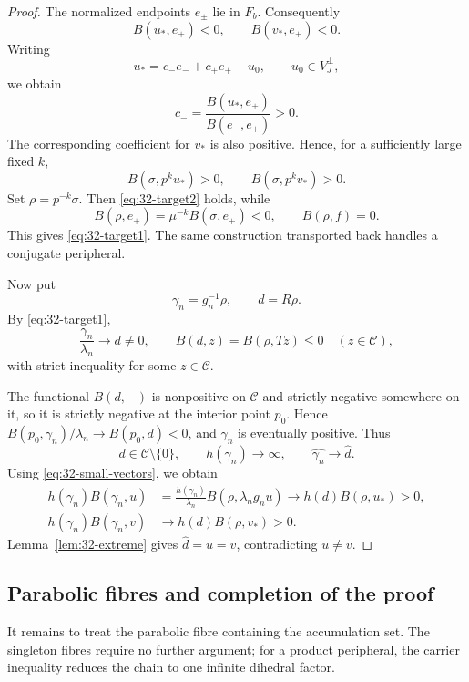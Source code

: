 \documentclass[11pt,reqno]{amsart}
\theoremstyle{plain}
\theoremstyle{definition}
\theoremstyle{remark}
\numberwithin{equation}{section}
\begin{document}
\begin{proof}
The normalized endpoints $e_\pm$ lie in $F_b$.
Consequently
\[
    B(u_*,e_+)<0,\qquad B(v_*,e_+)<0.
\]
Writing
\[
    u_*=c_-e_-+c_+e_++u_0,
    \qquad u_0\in V_J^\perp,
\]
we obtain
\[
    c_-=\frac{B(u_*,e_+)}{B(e_-,e_+)}>0.
\]
The corresponding coefficient for $v_*$ is also positive.
Hence, for a sufficiently large fixed $k$,
\[
    B(\sigma,p^ku_*)>0,\qquad
    B(\sigma,p^kv_*)>0.
\]
Set $\rho=p^{-k}\sigma$.
Then \eqref{eq:32-target2} holds, while
\[
    B(\rho,e_+)=\mu^{-k}B(\sigma,e_+)<0,
    \qquad
    B(\rho,f)=0.
\]
This gives \eqref{eq:32-target1}.
The same construction transported back handles a
conjugate peripheral.

Now put
\[
    \gamma_n=g_n^{-1}\rho,\qquad d=R\rho.
\]
By \eqref{eq:32-target1},
\[
    \frac{\gamma_n}{\lambda_n}\to d\ne0,
    \qquad
    B(d,z)=B(\rho,Tz)\leq0
    \quad(z\in\mathcal C),
\]
with strict inequality for some $z\in\mathcal C$.

The functional $B(d,-)$ is nonpositive on $\mathcal C$ and strictly
negative somewhere on it, so it is strictly negative at the interior
point $p_0$. Hence $B(p_0,\gamma_n)/\lambda_n\to B(p_0,d)<0$,
and $\gamma_n$ is eventually positive.
Thus
\[
    d\in\mathcal C\setminus\{0\},
    \qquad
    h(\gamma_n)\to\infty,
    \qquad
    \widehat{\gamma_n}\to\widehat d.
\]
Using \eqref{eq:32-small-vectors}, we obtain
\begin{align*}
    h(\gamma_n)B(\gamma_n,u)
    &=
    \frac{h(\gamma_n)}{\lambda_n}
    B(\rho,\lambda_ng_nu)
    \longrightarrow h(d)B(\rho,u_*)>0,\\
    h(\gamma_n)B(\gamma_n,v)
    &\longrightarrow h(d)B(\rho,v_*)>0.
\end{align*}
Lemma~\ref{lem:32-extreme} gives
$\widehat d=u=v$, contradicting $u\ne v$.
\end{proof}

\subsection{Parabolic fibres and completion of the proof}\label{subsec:32-parabolic}

It remains to treat the parabolic fibre containing the accumulation set.
The singleton fibres require no further argument; for a product peripheral,
the carrier inequality reduces the chain to one infinite dihedral factor.
\end{document}
